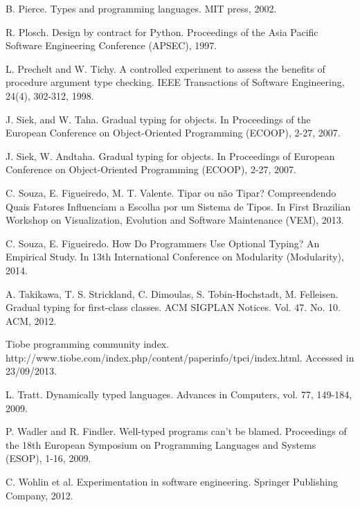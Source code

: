 \documentclass[msc]{ppgccufmg}
\begin{document}
\begin{thebibliography}{}
B. Pierce. Types and programming languages. MIT press, 2002.

R. Plosch. Design by contract for Python. Proceedings of the Asia Pacific Software Engineering Conference (APSEC), 1997.

L. Prechelt and  W. Tichy. A controlled experiment to assess the benefits of procedure argument type checking. IEEE Transactions of Software Engineering, 24(4), 302-312, 1998.

J. Siek, and W. Taha. Gradual typing for objects. In Proceedings of the European Conference on Object-Oriented Programming (ECOOP),  2-27, 2007.

J. Siek, W. Andtaha. Gradual typing for objects. In Proceedings of European Conference on Object-Oriented Programming (ECOOP), 2-27, 2007.

C. Souza, E. Figueiredo, M. T. Valente. Tipar ou não Tipar? Compreendendo Quais Fatores Influenciam a Escolha por um Sistema de Tipos. In First Brazilian Workshop on Visualization, Evolution and Software Maintenance (VEM), 2013. 

C. Souza, E. Figueiredo. How Do Programmers Use Optional Typing? An Empirical Study. In 13th International Conference on Modularity (Modularity), 2014.

A. Takikawa, T. S. Strickland, C. Dimoulas, S. Tobin-Hochstadt, M. Felleisen. Gradual typing for first-class classes. ACM SIGPLAN Notices. Vol. 47. No. 10. ACM, 2012.

Tiobe programming community index. http://www.tiobe.com/index.php/content/paperinfo/tpci/index.html. Accessed in 23/09/2013.

L. Tratt. Dynamically typed languages. Advances in Computers, vol. 77, 149-184, 2009.

P. Wadler and R. Findler. Well-typed programs can't be blamed. Proceedings of the 18th European Symposium on Programming Languages and Systems (ESOP), 1-16, 2009.

C. Wohlin et al. Experimentation in software engineering. Springer Publishing Company, 2012.

\end{thebibliography}


\begin{appendices}


\end{appendices}


\begin{attachments}




\end{attachments}
\end{document}
